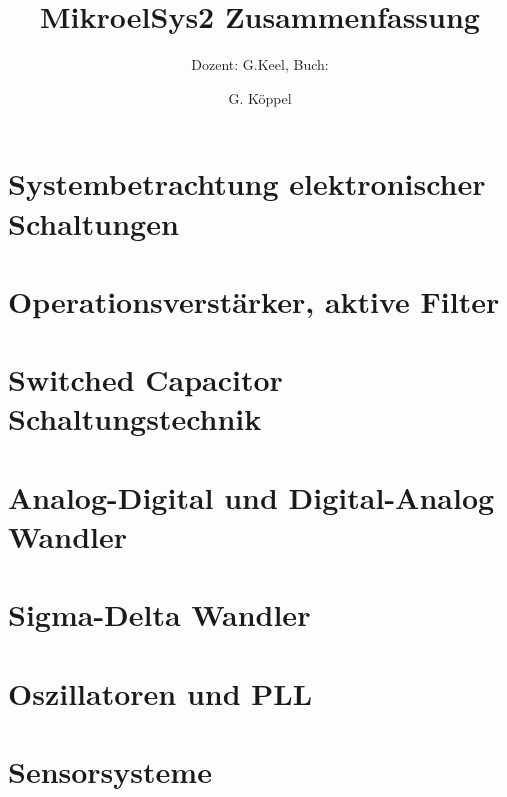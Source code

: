 \documentclass{scrartcl}
\title{MikroelSys2 Zusammenfassung}
\subtitle{Dozent: G.Keel, Buch:}
\author{G. Köppel}
\begin{document}

\maketitle
\newpage

\tableofcontents
\newpage


\section{Systembetrachtung elektronischer Schaltungen}
\section{Operationsverstärker, aktive Filter}
\section{Switched Capacitor Schaltungstechnik}
\section{Analog-Digital und Digital-Analog Wandler}
\section{Sigma-Delta Wandler}
\section{Oszillatoren und PLL}
\section{Sensorsysteme}
\end{document}
